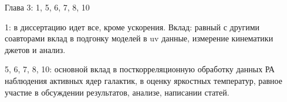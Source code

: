 Глава 3: 1, 5, 6, 7, 8, 10

1: в диссертацию идет все, кроме ускорения.
Вклад: равный с другими соавторами вклад в подгонку моделей в uv данные, измерение кинематики джетов
и анализ.

5, 6, 7, 8, 10: основной вклад в посткорреляционную обработку данных РА наблюдения активных ядер
галактик, в оценку яркостных температур, равное участие в обсуждении результатов, анализе, написании
статей.



%
%
